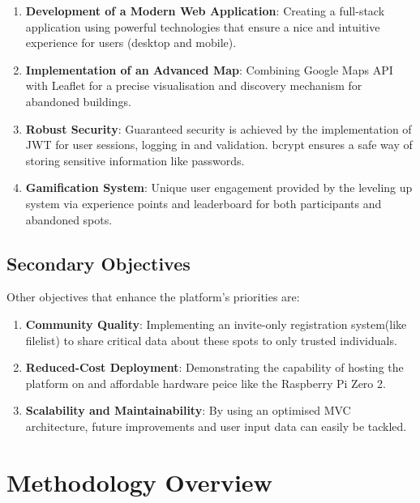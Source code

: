 \documentclass[12pt,a4paper]{report}
\begin{document}
\begin{enumerate}
    \item \textbf{Development of a Modern Web Application}: Creating a full-stack application using powerful technologies that ensure a nice and intuitive experience for users (desktop and mobile).
    
    \item \textbf{Implementation of an Advanced Map}: Combining Google Maps API with Leaflet for a precise visualisation and discovery mechanism for abandoned buildings.
    
    \item \textbf{Robust Security}: Guaranteed security is achieved by the implementation of JWT for user sessions, logging in and validation. bcrypt ensures a safe way of storing sensitive information like passwords.
    
    \item \textbf{Gamification System}: Unique user engagement provided by the leveling up system via experience points and leaderboard for both participants and abandoned spots.
\end{enumerate}

\subsection*{Secondary Objectives}

Other objectives that enhance the platform's priorities are:

\begin{enumerate}
    \item \textbf{Community Quality}: Implementing an invite-only registration system(like filelist) to share critical data about these spots to only trusted individuals.
    
    \item \textbf{Reduced-Cost Deployment}: Demonstrating the capability of hosting the platform on and affordable hardware peice like the Raspberry Pi Zero 2.
    
    \item \textbf{Scalability and Maintainability}: By using an optimised MVC architecture, future improvements and user input data can easily be tackled.

\end{enumerate}

\section*{Methodology Overview}
\end{document}
